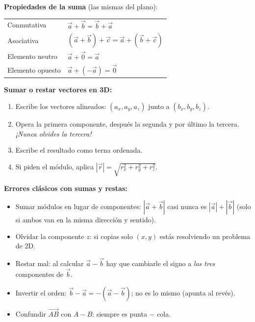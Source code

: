 \documentclass[12pt, letterpaper]{article}
\begin{document}
\begin{cuadroteoria}
  \textbf{Propiedades de la suma} (las mismas del plano):
  \begin{center}
    \begin{tabular}{ll}
      \toprule
      Conmutativa      & $\vec{a} + \vec{b} = \vec{b} + \vec{a}$ \\
      Asociativa       & $(\vec{a}+\vec{b}) + \vec{c} = \vec{a} + (\vec{b}+\vec{c})$ \\
      Elemento neutro  & $\vec{a} + \vec{0} = \vec{a}$ \\
      Elemento opuesto & $\vec{a} + (-\vec{a}) = \vec{0}$ \\
      \bottomrule
    \end{tabular}
  \end{center}
\end{cuadroteoria}

\begin{cuadropasos}
  \textbf{Sumar o restar vectores en 3D:}
  \begin{enumerate}[leftmargin=*]
    \item Escribe los vectores alineados: $(a_x, a_y, a_z)$ junto a $(b_x, b_y, b_z)$.
    \item Opera la primera componente, después la segunda y por último la tercera. \emph{¡Nunca olvides la tercera!}
    \item Escribe el resultado como terna ordenada.
    \item Si piden el módulo, aplica $|\vec{r}| = \sqrt{r_x^2 + r_y^2 + r_z^2}$.
  \end{enumerate}
\end{cuadropasos}

\begin{cuadroadvertencia}
  \textbf{Errores clásicos con sumas y restas:}
  \begin{itemize}[leftmargin=*]
    \item Sumar módulos en lugar de componentes: $|\vec{a}+\vec{b}|$ casi nunca es $|\vec{a}| + |\vec{b}|$ (solo si ambos van en la misma dirección y sentido).
    \item Olvidar la componente $z$: si copias solo $(x,y)$ estás resolviendo un problema de 2D.
    \item Restar mal: al calcular $\vec{a}-\vec{b}$ hay que cambiarle el signo a \emph{las tres} componentes de $\vec{b}$.
    \item Invertir el orden: $\vec{b}-\vec{a} = -(\vec{a}-\vec{b})$; no es lo mismo (apunta al revés).
    \item Confundir $\overrightarrow{AB}$ con $A-B$: siempre es punta $-$ cola.
  \end{itemize}
\end{cuadroadvertencia}
\end{document}

